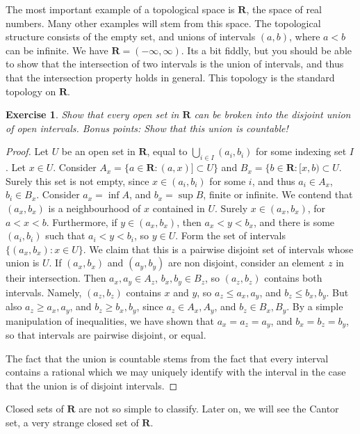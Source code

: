 \documentclass{report}
\theoremstyle{plain}
\newtheorem{exercise}{Exercise}[section]
\theoremstyle{definition}
\begin{document}
The most important example of a topological space is $\mathbf{R}$, the space of real numbers. Many other examples will stem from this space. The topological structure consists of the empty set, and unions of intervals $(a,b)$, where $a < b$ can be infinite. We have $\mathbf{R} = (-\infty, \infty)$. Its a bit fiddly, but you should be able to show that the intersection of two intervals is the union of intervals, and thus that the intersection property holds in general. This topology is the standard topology on $\mathbf{R}$.

\begin{exercise}
    Show that every open set in $\mathbf{R}$ can be broken into the disjoint union of open intervals. Bonus points: Show that this union is countable!
\end{exercise}
\begin{proof}
    Let $U$ be an open set in $\mathbf{R}$, equal to $\bigcup_{i \in I} (a_i, b_i)$ for some indexing set $I$. Let $x \in U$. Consider $A_x = \{ a \in \mathbf{R} : (a,x)] \subset U \}$ and $B_x = \{ b \in \mathbf{R} : [x,b) \subset U$. Surely this set is not empty, since $x \in (a_i, b_i)$ for some $i$, and thus $a_i \in A_x$, $b_i \in B_x$. Consider $a_x = \inf A$, and $b_x = \sup B$, finite or infinite. We contend that $(a_x,b_x)$ is a neighbourhood of $x$ contained in $U$. Surely $x \in (a_x,b_x)$, for $a < x < b$. Furthermore, if $y \in (a_x,b_x)$, then $a_x < y < b_x$, and there is some $(a_i, b_i)$ such that $a_i < y < b_i$, so $y \in U$. Form the set of intervals $\{ (a_x, b_x): x \in U\}$. We claim that this is a pairwise disjoint set of intervals whose union is $U$. If $(a_x, b_x)$ and $(a_y, b_y)$ are non disjoint, consider an element $z$ in their intersection. Then $a_x, a_y \in A_z$, $b_x, b_y \in B_z$, so $(a_z, b_z)$ contains both intervals. Namely, $(a_z, b_z)$ contains $x$ and $y$, so $a_z \leq a_x, a_y$, and $b_z \leq b_x, b_y$. But also $a_z \geq a_x, a_y$, and $b_z \geq b_x, b_y$, since $a_z \in A_x, A_y$, and $b_z \in B_x, B_y$. By a simple manipulation of inequalities, we have shown that $a_x = a_z = a_y$, and $b_x = b_z = b_y$, so that intervals are pairwise disjoint, or equal.

    The fact that the union is countable stems from the fact that every interval contains a rational which we may uniquely identify with the interval in the case that the union is of disjoint intervals.
\end{proof}

Closed sets of $\mathbf{R}$ are not so simple to classify. Later on, we will see the Cantor set, a very strange closed set of $\mathbf{R}$.
\end{document}
